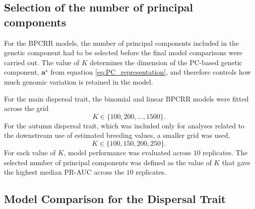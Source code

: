 
\subsection{Selection of the number of principal components}

For the BPCRR models, the number of principal components included in the genetic component had to be selected before the final model comparisons were carried out. The value of $K$ determines the dimension of the PC-based genetic component, $\mathbf{a}^\star$ from equation \eqref{eq:PC_representation}, 
%
%
and therefore controls how much genomic variation is retained in the model.

For the main dispersal trait, the binomial and linear BPCRR models were fitted across the grid
\[
K \in \{100, 200, \dots, 1500\}.
\]
For the autumn dispersal trait, which was included only for analyses related to the downstream use of estimated breeding values, a smaller grid was used,
\[
K \in \{100, 150, 200, 250\}.
\]
%
For each value of $K$, model performance was evaluated across $10$ replicates. The selected number of principal components was defined as the value of $K$ that gave the highest median PR-AUC across the $10$ replicates.

\subsection{Model Comparison for the Dispersal Trait}

